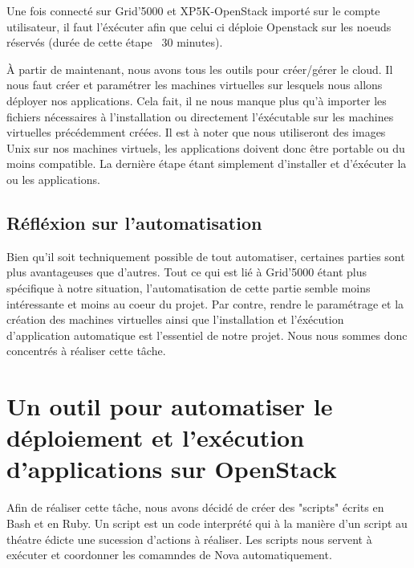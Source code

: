 \documentclass{report}
\begin{document}
Une fois connecté sur Grid'5000 et XP5K-OpenStack importé sur le compte utilisateur, il faut l'éxécuter afin que celui ci déploie Openstack sur les noeuds réservés (durée de cette étape ~30 minutes).\bigbreak

À partir de maintenant, nous avons tous les outils pour créer/gérer le cloud. Il nous faut créer et paramétrer les machines virtuelles sur lesquels nous allons déployer nos applications. Cela fait, il ne nous manque plus qu'à importer les fichiers nécessaires à l'installation ou directement l'éxécutable sur les machines virtuelles précédemment créées. Il est à noter que nous utiliseront des images Unix sur nos machines virtuels, les applications doivent donc être portable ou du moins compatible.
La dernière étape étant simplement d'installer et d'éxécuter la ou les applications.







    \section{Réfléxion sur l'automatisation}
    Bien qu'il soit techniquement possible de tout automatiser, certaines parties sont plus avantageuses que d'autres. Tout ce qui est lié à Grid'5000 étant plus spécifique à notre situation, l'automatisation de cette partie semble moins intéressante et moins au coeur du projet.
    Par contre, rendre le paramétrage et la création des machines virtuelles ainsi que l'installation et l'éxécution d'application automatique est l'essentiel de notre projet. Nous nous sommes donc concentrés à réaliser cette tâche.




\chapter{Un outil pour automatiser le déploiement et l'exécution d'applications sur OpenStack}

Afin de réaliser cette tâche, nous avons décidé de créer des "scripts" écrits en Bash et en Ruby. Un script est un code interprété qui à la manière d'un script au théatre édicte une sucession d'actions à réaliser. Les scripts nous servent à exécuter et coordonner les comamndes de Nova automatiquement.
\end{document}
